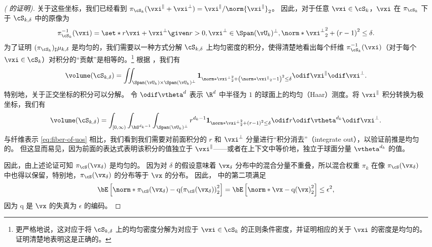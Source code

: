 \documentclass[../../book-main_zh.tex]{subfiles}
\begin{document}
\begin{proof}[( 的证明)]
    关于这些坐标，我们已经看到 $\pi_{\cS_k}(\vxi^\| + \vxi^\perp) = \vxi^\| / \norm{\vxi^{\|}}_2$。
    因此，对于任意 $\vxi \in \cS_{k}$，$\vxi$ 在 $\pi_{\cS_k}$ 下于 $\cS_{k, \delta}$ 中的原像为
    \begin{equation}
        \pi_{\cS_k}^{-1}(\vxi) = \set*{
            r\vxi + \vxi^\perp
            \given
            r > 0,
            \vxi^{\perp} \in \Span(\vU_k)^\perp,
            \norm*{\vxi^{\perp}}_2^2
            + \left( r - 1 \right)^2
            \leq
            \delta
        }.
        \label{eq:fiber-of-uos}
    \end{equation}
    为了证明 $(\pi_{\cS_k})_{\sharp} \mu_{k, \delta}$ 是均匀的，我们需要以一种方式分解 $\cS_{k, \delta}$ 上均匀密度的积分，使得清楚地看出每个纤维 $\pi_{\cS_k}^{-1}(\vxi)$（对于每个 $\vxi \in \cS_k$）对积分的“贡献”是相等的。\footnote{更严格地说，这对应于将 $\cS_{k, \delta}$ 上的均匀密度分解为对应于 $\vxi \in \cS_{k}$ 的正则条件密度，并证明相应的关于 $\vxi$ 的密度是均匀的。证明清楚地表明这是正确的。}
    根据 ，我们有
    \begin{equation}
        \volume(\cS_{k, \delta})
        = \iint_{\Span(\vU_k) \times \Span(\vU_k)^\perp} \mathbf{1}_{
            \norm*{\vxi^{\perp}}_2^2
            + \left( \norm*{\vxi^{\|}}_2 - 1 \right)^2
            \leq
            \delta
        }
        \odif \vxi^{\|} \odif \vxi^{\perp}.
    \end{equation}
    特别地，关于正交坐标的积分可以分解。
    令 $\odif \vtheta^{d}$ 表示 $\R^d$ 中半径为 $1$ 的球面上的均匀（Haar）测度。将 $\vxi^{\|}$ 积分转换为极坐标，我们有
    \begin{equation}
        \volume(\cS_{k, \delta})
        = \int_{[0, \infty)} \int_{\bS^{d_k-1}} \int_{\Span(\vU_k)^\perp}
        r^{d_k-1}
        \mathbf{1}_{
            \norm*{\vxi^{\perp}}_2^2
            + \left( r - 1 \right)^2
            \leq
            \delta
        }
        \odif r \odif \vtheta^{d_k} \odif \vxi^{\perp}.
    \end{equation}
    与纤维表示 \eqref{eq:fiber-of-uos} 相比，我们看到我们需要对前面积分的 $r$ 和 $\vxi^\perp$ 分量进行“积分消去”（integrate out），以验证前推是均匀的。
    但这显而易见，因为前面的表达式表明该积分的值独立于 $\vxi^\|$——或者在上下文中等价地，独立于球面分量 $\vtheta^{d_k}$ 的值。

    因此，由上述论证可知 $\pi_{\cS}(\vx_{\delta})$ 是均匀的。
    因为对 $\delta$ 的假设意味着 $\vx_{\delta}$ 分布中的混合分量不重叠，所以混合权重 $\pi_k$ 在像 $\pi_{\cS}(\vx_{\delta})$ 中也得以保留，特别地，$\pi_{\cS}(\vx_{\delta})$ 的分布等于 $\vx$ 的分布。
    因此， 中的第二项满足
    \begin{equation}
        \bE\left[ \norm*{ \pi_{\cS}(\vx_{\delta}) -
        \mathrm{q}(\pi_{\cS}(\vx_{\delta})) }_2^2 \right]
        =
        \bE\left[ \norm*{ \vx - \mathrm{q}(\vx) }_2^2 \right]
        \leq
        \epsilon^2,
    \end{equation}
    因为 $\mathrm{q}$ 是 $\vx$ 的失真为 $\epsilon$ 的编码。


\end{proof}
\end{document}
